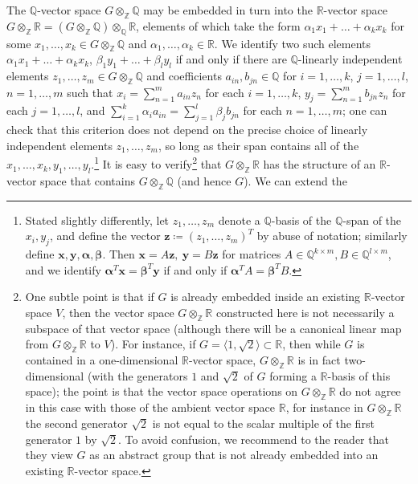 \documentclass[11pt,a4paper,reqno]{amsart}
\numberwithin{equation}{section}
\theoremstyle{plain}
\theoremstyle{definition}
\newcommand\R{\mathbb{R}}
\newcommand\Z{\mathbb{Z}}
\newcommand\Q{\mathbb{Q}}
\begin{document}
The $\Q$-vector space $G \otimes_\Z \Q$ may be embedded in turn into the
$\R$-vector space $G \otimes_\Z \R = (G \otimes_\Z \Q) \otimes_\Q \R$,
elements of which take the form $\alpha_1 x_1 + \dots + \alpha_k x_k$ for
some $x_1,\dots,x_k \in G \otimes_\Z \Q$ and $\alpha_1,\dots,\alpha_k \in
\R$.  We identify two such elements $\alpha_1 x_1 + \dots + \alpha_k
x_k$, $\beta_1 y_1 + \dots + \beta_l y_l$ if and only if there are
$\Q$-linearly independent elements $z_1,\dots,z_m \in G \otimes_\Z \Q$
and coefficients $a_{in}, b_{jn} \in \Q$ for $i=1,\dots,k$,
$j=1,\dots,l$, $n=1,\dots,m$ such that $x_i = \sum_{n=1}^m a_{in} z_n$
for each $i=1,\dots,k$, $y_j = \sum_{n=1}^m b_{jn} z_n$ for each
$j=1,\dots,l$, and $\sum_{i=1}^k \alpha_i a_{in} = \sum_{j=1}^l \beta_j
b_{jn}$ for each $n=1,\dots,m$; one can check that this criterion does not
depend on the precise choice of linearly independent elements
$z_1,\dots,z_m$, so long as their span contains all of the
$x_1,\dots,x_k, y_1,\dots,y_l$.\footnote{Stated slightly differently, let
$z_1, \dots, z_m$ denote a $\Q$-basis of the $\Q$-span of the $x_i, y_j$,
and define the vector $\bm{z} \coloneqq (z_1, \dots, z_m)^T$ by abuse of
notation; similarly define $\bm{x}, \bm{y}, \bm{\alpha}, \bm{\beta}$.
Then $\bm{x} = A \bm{z}, \ \bm{y} = B \bm{z}$ for matrices
$A \in \Q^{k \times m}, B \in \Q^{l \times m}$, and
we identify $\bm{\alpha}^T \bm{x} = \bm{\beta}^T \bm{y}$ if and only if
$\bm{\alpha}^T A = \bm{\beta}^T B$.}
It is easy to verify\footnote{One subtle point is that if $G$ is already
embedded inside an existing $\R$-vector space $V$, then the vector space
$G \otimes_\Z \R$ constructed here is not necessarily a subspace of that
vector space (although there will be a canonical linear map from $G
\otimes_\Z \R$ to $V$).  For instance, if $G = \langle 1, \sqrt{2}
\rangle \subset \R$, then while $G$ is contained in a one-dimensional
$\R$-vector space, $G \otimes_\Z \R$ is in fact two-dimensional (with the
generators $1$ and $\sqrt{2}$ of $G$ forming a $\R$-basis of this space);
the point is that the vector space operations on $G \otimes_\Z \R$ do not
agree in this case with those of the ambient vector space $\R$, for
instance in $G \otimes_\Z \R$ the second generator $\sqrt{2}$ is not
equal to the scalar multiple of the first generator $1$ by $\sqrt{2}$.
To avoid confusion, we recommend to the reader that they view $G$ as an
abstract group that is not already embedded into an existing $\R$-vector
space.} that $G \otimes_\Z \R$ has the structure of an $\R$-vector space
that contains $G \otimes_\Z \Q$ (and hence $G$).  We can extend the
\end{document}
